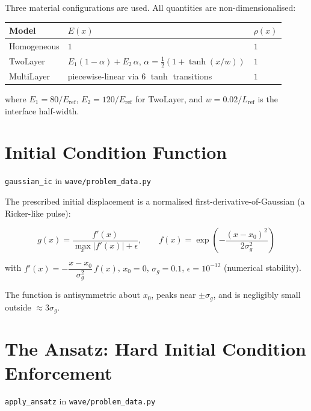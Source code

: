 \documentclass[11pt, a4paper]{article}
\newcommand{\fn}[1]{\texttt{\color{codeblue}#1}}
\newcommand{\file}[1]{\texttt{#1}}
\begin{document}
Three material configurations are used. All quantities are non-dimensionalised:

\begin{center}
\begin{tabular}{lll}
\toprule
\textbf{Model} & $E(x)$ & $\rho(x)$ \\
\midrule
Homogeneous & $1$ & $1$ \\
TwoLayer & $E_1(1-\alpha) + E_2\,\alpha$,\;
          $\alpha = \tfrac{1}{2}(1 + \tanh(x/w))$ & $1$ \\
MultiLayer & piecewise-linear via 6 $\tanh$ transitions & $1$ \\
\bottomrule
\end{tabular}
\end{center}

where $E_1 = 80/E_\mathrm{ref}$, $E_2 = 120/E_\mathrm{ref}$ for TwoLayer,
and $w = 0.02/L_\mathrm{ref}$ is the interface half-width.


\section{Initial Condition Function}
\fn{gaussian\_ic} in \file{wave/problem\_data.py}

The prescribed initial displacement is a normalised first-derivative-of-Gaussian
(a Ricker-like pulse):

\begin{equation}
  g(x) = \frac{f'(x)}{\max_x |f'(x)| + \epsilon},
  \qquad
  f(x) = \exp\!\left(-\frac{(x - x_0)^2}{2\sigma_g^2}\right)
  \label{eq:ic_fn}
\end{equation}

with $f'(x) = -\dfrac{x - x_0}{\sigma_g^2}\,f(x)$, $x_0 = 0$,
$\sigma_g = 0.1$, $\epsilon = 10^{-12}$ (numerical stability).

The function is antisymmetric about $x_0$, peaks near $\pm\sigma_g$, and
is negligibly small outside $\approx 3\sigma_g$.


\section{The Ansatz: Hard Initial Condition Enforcement}
\fn{apply\_ansatz} in \file{wave/problem\_data.py}
\end{document}
